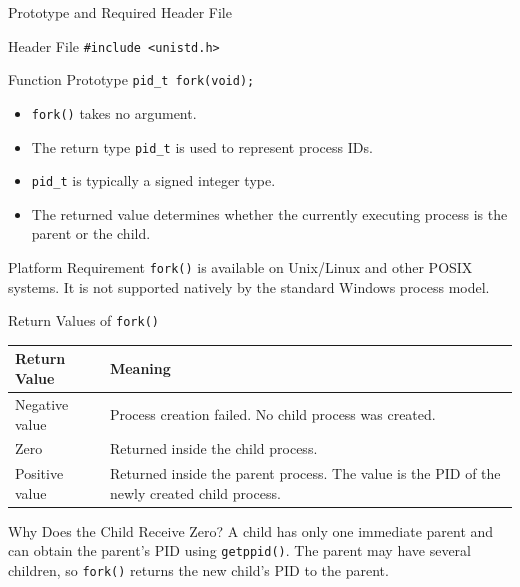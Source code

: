 \documentclass[aspectratio=169]{beamer}
\begin{document}
\begin{frame}{Prototype and Required Header File}

\begin{block}{Header File}
\centering
\texttt{\#include <unistd.h>}
\end{block}

\begin{block}{Function Prototype}
\centering
\texttt{pid\_t fork(void);}
\end{block}

\begin{itemize}
    \item \texttt{fork()} takes no argument.
    \item The return type \texttt{pid\_t} is used to represent process IDs.
    \item \texttt{pid\_t} is typically a signed integer type.
    \item The returned value determines whether the currently executing process
    is the parent or the child.
\end{itemize}

\begin{alertblock}{Platform Requirement}
\texttt{fork()} is available on Unix/Linux and other POSIX systems. It is not
supported natively by the standard Windows process model.
\end{alertblock}

\end{frame}

\begin{frame}{Return Values of \texttt{fork()}}

\begin{center}
\begin{tabular}{|>{\centering\arraybackslash}p{3cm}|p{8cm}|}
\hline
\textbf{Return Value} & \textbf{Meaning} \\
\hline
Negative value &
Process creation failed. No child process was created. \\
\hline
Zero &
Returned inside the child process. \\
\hline
Positive value &
Returned inside the parent process. The value is the PID of the newly created
child process. \\
\hline
\end{tabular}
\end{center}

\vspace{0.3cm}

\begin{alertblock}{Why Does the Child Receive Zero?}
A child has only one immediate parent and can obtain the parent's PID using
\texttt{getppid()}. The parent may have several children, so \texttt{fork()}
returns the new child's PID to the parent.
\end{alertblock}

\end{frame}
\end{document}
